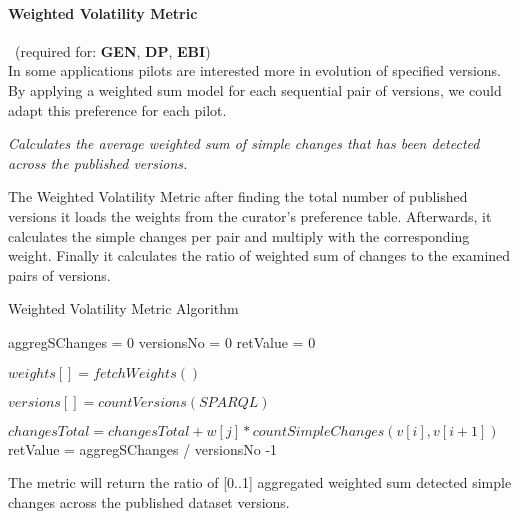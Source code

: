 \paragraph{Weighted Volatility Metric}~(required for: \textbf{GEN}, \textbf{DP}, \textbf{EBI})~\\ %
In some applications pilots are interested more in evolution of specified versions. By applying a weighted sum model \cite{WSM} for each sequential pair of versions, we could adapt this preference for each pilot.

\begin{mdframed}[style=metricdefinition]
\emph{Calculates the average weighted sum of simple changes that has been detected across the published versions.}
\end{mdframed}

The Weighted Volatility Metric after finding the total number of published versions it loads the weights
from the curator's preference table. Afterwards, it calculates the simple changes per pair and multiply with the corresponding weight. Finally it calculates the ratio of weighted sum of changes to the examined pairs of versions.


\begin{algorithm}
\caption{Weighted Volatility Metric Algorithm}
\begin{algorithmic}[1]

\State aggregSChanges = 0
\State versionsNo = 0
\State retValue = 0
\EndProcedure

\State $ weights [] = fetchWeights()$
\EndProcedure

\State $ versions [] = countVersions (SPARQL)$

\State $changesTotal = changesTotal + w[j]*countSimpleChanges(v[i],v[i+1])$
	\EndFor
\EndFor
\EndProcedure
\State retValue = aggregSChanges / versionsNo -1
\State {}
\end{algorithmic}
\end{algorithm}

The metric will return the ratio of [0..1] aggregated weighted sum detected simple changes across the published dataset versions.

